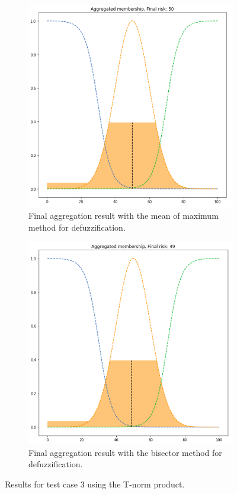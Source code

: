 \begin{figure}[ht]
\begin{subfigure}{.5\textwidth}
  \centering
  \includegraphics[width=.8\linewidth]{figures/third/prod-mom.png}  
  \caption{Final aggregation result with the mean of maximum method for defuzzification.}
  \label{fig:3prod-mom}
\end{subfigure}
\begin{subfigure}{.5\textwidth}
  \centering
  \includegraphics[width=.8\linewidth]{figures/third/prod-bisector.png}  
  \caption{Final aggregation result with the bisector method for defuzzification.}
  \label{fig:3prod-bisector}
\end{subfigure}
\caption{Results for test case 3 using the T-norm product.}
\label{fig:testcase3prod}
\end{figure}
